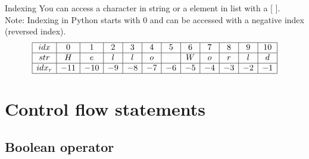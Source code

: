 \documentclass{beamer}
\begin{document}
\begin{frame}{}
    \begin{block}{Indexing}
        You can access a character in string or a element in list with a [ ]. \\
        Note: Indexing in Python starts with 0 and can be accessed with a negative index (reversed index).
        \[
            \begin{array}{|c|c|c|c|c|c|c|c|c|c|c|c|c|}
                \hline
                idx     & 0   & 1   & 2  & 3  & 4  & 5  & 6  & 7  & 8  & 9  & 10 \\
                \hline
                str     & H   & e   & l  & l  & o  & \  & W  & o  & r  & l  & d  \\
                \hline
                idx_{r} & -11 & -10 & -9 & -8 & -7 & -6 & -5 & -4 & -3 & -2 & -1 \\
                \hline
            \end{array}
        \]
        

    \end{block}
\end{frame}

\section[Control flow]{Control flow statements }
\subsection[Boolean operator]{Boolean operator}
\end{document}
